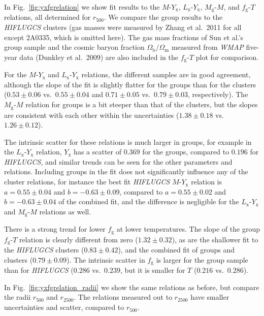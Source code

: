 \documentclass[structabstract]{aa}
\begin{document}
In Fig.\ \ref{fig:yxfgrelation} we show fit results to the
$M$-$Y_{\text{x}}$, $L_{\text{x}}$-$Y_{\text{x}}$,
$M_{\text{g}}$-$M$, and $f_{\text{g}}$-$T$ relations, all determined
for $r_{500}$. We compare the group results to the \emph{HIFLUGCS}
clusters (gas masses were measured by Zhang et al.\ 2011 for all except
2A0335, which is omitted here). The gas mass fractions of
Sun et al.'s group sample and the cosmic baryon fraction
$\Omega_{\text{b}}/\Omega_{\text{m}}$ measured from \emph{WMAP}
five-year data (Dunkley et al.\ 2009) are also included in the
$f_{\text{g}}$-$T$ plot for comparison.

For the $M$-$Y_{\text{x}}$ and $L_{\text{x}}$-$Y_{\text{x}}$
relations, the different samples are in good agreement, although the slope
  of the fit is slightly flatter for the groups than for the clusters
($0.53 \pm 0.06$ vs.\ $0.55 \pm 0.04$ and $0.71 \pm 0.05$ vs.\ $0.79
\pm 0.03$, respectively). The $M_{\text{g}}$-$M$ relation for groups
is a bit steeper than that of the clusters, but the slopes are
  consistent with each other within the uncertainties
  ($1.38\pm0.18$ vs.\ $1.26\pm0.12$).

The intrinsic scatter for these relations is much larger in
  groups, for example in the $L_{\text{x}}$-$Y_{\text{x}}$ relation,
  $Y_{\text{x}}$ has a scatter of $0.369$ for the groups, compared to
  $0.196$ for \emph{HIFLUGCS}, and similar trends can be seen for the
  other parameters and relations. Including groups in the fit does not
  significantly influence any of the cluster relations, for instance
  the best fit \emph{HIFLUGCS} $M$-$Y_{\text{x}}$ relation is
  $a=0.55\pm0.04$ and $b=-0.63\pm0.09$, compared to $a=0.55\pm0.02$ and
  $b=-0.63\pm0.04$ of the combined fit, and the difference is negligible for the
  $L_{\text{x}}$-$Y_{\text{x}}$ and $M_{\text{g}}$-$M$ relations as well.

There is a strong trend for lower $f_{\text{g}}$ at lower
temperatures. The slope of the group $f_{\text{g}}$-$T$ relation is
clearly different from zero ($1.32 \pm 0.32$), as are the shallower
fit to the \emph{HIFLUGCS} clusters ($0.83\pm0.42$), and the combined
fit of groups and clusters ($0.79 \pm 0.09$). The intrinsic
  scatter in $f_{\text{g}}$ is larger for the group sample than for
  \emph{HIFLUGCS} ($0.286$ vs.\ $0.239$, but it is smaller
  for $T$ ($0.216$ vs.\ $0.286$).

In Fig.\ \ref{fig:yxfgrelation_radii} we show the same relations as
before, but compare the radii $r_{500}$ and $r_{2500}$. The relations
measured out to $r_{2500}$ have smaller uncertainties and scatter,
compared to $r_{500}$.
\end{document}
